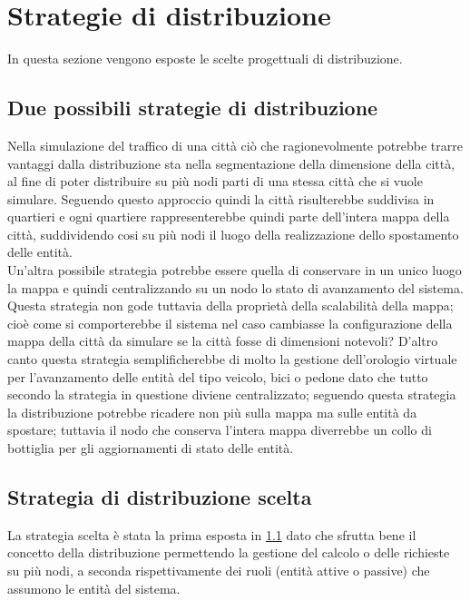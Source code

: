 \section{Strategie di distribuzione}
In questa sezione vengono esposte le scelte progettuali di distribuzione.\\
\subsection{Due possibili strategie di distribuzione}
\label{scelted}
Nella simulazione del traffico di una città ciò che ragionevolmente potrebbe trarre vantaggi dalla distribuzione sta nella segmentazione della dimensione della città, al fine di poter distribuire su più nodi parti di una stessa città che si vuole simulare. Seguendo questo approccio quindi la città risulterebbe suddivisa in quartieri e ogni quartiere rappresenterebbe quindi parte dell'intera mappa della città, suddividendo cosi su più nodi il luogo della realizzazione dello spostamento delle entità. \\
Un'altra possibile strategia potrebbe essere quella di conservare in un unico luogo la mappa e quindi centralizzando su un nodo lo stato di avanzamento del sistema. Questa strategia non gode tuttavia della proprietà della scalabilità della mappa; cioè come si comporterebbe il sistema nel caso cambiasse la configurazione della mappa della città da simulare se la città fosse di dimensioni notevoli? D'altro canto questa strategia semplificherebbe di molto la gestione dell'orologio virtuale per l'avanzamento delle entità del tipo veicolo, bici o pedone dato che tutto secondo la strategia in questione diviene centralizzato; seguendo questa strategia la distribuzione potrebbe ricadere non più sulla mappa ma sulle entità da spostare; tuttavia il nodo che conserva l'intera mappa diverrebbe un collo di bottiglia per gli aggiornamenti di stato delle entità. \\
\subsection{Strategia di distribuzione scelta}
La strategia scelta è stata la prima esposta in \ref{scelted} dato che sfrutta bene il concetto della distribuzione permettendo la gestione del calcolo o delle richieste su più nodi, a seconda rispettivamente dei ruoli (entità attive o passive) che assumono le entità del sistema.

